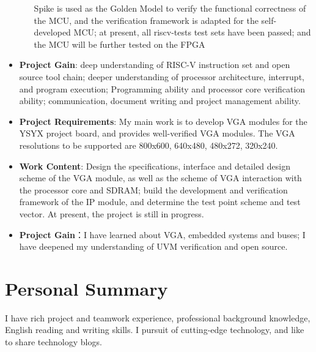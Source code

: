 \documentclass{resume}
\begin{document}
\begin{itemize}
\begin{enumerate}
              Spike is used as the Golden Model to verify the functional correctness of the MCU, and the verification framework is adapted for the self-developed MCU; at present, all riscv-tests test sets have been passed; and the MCU will be further tested on the FPGA
    \end{enumerate}
    \item \textbf{Project Gain}: deep understanding of RISC-V instruction set and open source tool chain; deeper understanding of processor architecture, interrupt, and program execution;
          Programming ability and processor core verification ability; communication, document writing and project management ability.
\end{itemize}


\begin{itemize}
    \item \textbf{Project Requirements}: My main work is to develop VGA modules for the YSYX project board, and provides well-verified VGA modules. 
          The VGA resolutions to be supported are 800x600, 640x480, 480x272, 320x240.
    \item \textbf{Work Content}: Design the specifications, interface and detailed design scheme of the VGA module, 
          as well as the scheme of VGA interaction with the processor core and SDRAM; 
          build the development and verification framework of the IP module, and determine the test point scheme and test vector. 
          At present, the project is still in progress. 
    \item \textbf{Project Gain}：I have learned about VGA, embedded systems and buses; I have deepened my understanding of UVM verification and open source.
\end{itemize}

\section{Personal Summary}
I have rich project and teamwork experience, professional background knowledge, English reading and writing skills. I pursuit of cutting-edge technology, and like to share technology blogs.
\end{document}
